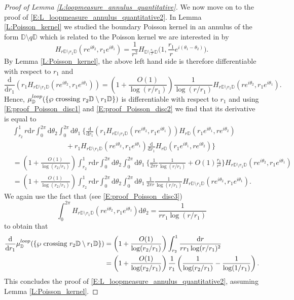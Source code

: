 \documentclass[11pt]{article}
\theoremstyle{remark}
\newcommand{\D}{\mathbb{D}}
\renewcommand{\d}{\mathrm{d}}
\def \loopmeasure{\mu^{\rm loop}}
\numberwithin{equation}{section}
\begin{document}
\begin{proof}[Proof of Lemma \ref{L:loopmeasure_annulus_quantitative}]
We now move on to the proof of \eqref{E:L_loopmeasure_annulus_quantitative2}.
In Lemma \ref{L:Poisson_kernel} we studied the boundary Poisson kernel in an annulus of the form $\D \setminus q \D$ which is related to the Poisson kernel we are interested in by
\[
H_{r \D \setminus r_1 \D}(r e^{i\theta_2},r_1 e^{i\theta_1}) = \frac{1}{r^2} H_{\D \setminus \frac{r_1}{r} \D}\Big(1, \frac{r_1}{r} e^{i(\theta_1-\theta_2)}\Big).
\]
By Lemma \ref{L:Poisson_kernel}, the above left hand side is therefore differentiable with respect to $r_1$ and
\[
\frac{\d}{\d r_1} \left( r_1 H_{r \D \setminus r_1 \D}(r e^{i\theta_2},r_1 e^{i\theta_1}) \right) = \left( 1 + \frac{O(1)}{\log(r/r_1)} \right) \frac{1}{\log(r/r_1)} H_{r \D \setminus r_1 \D}(r e^{i\theta_2},r_1 e^{i\theta_1}).
\]
Hence, $\loopmeasure_\D ( \{ \wp \mathrm{~crossing~} r_2 \D \setminus r_1 \D \} )$ is differentiable with respect to $r_1$ and using \eqref{E:proof_Poisson_disc1} and \eqref{E:proof_Poisson_disc2} we find that its derivative is equal to
\begin{align*}
& \int_{r_2}^1 r \d r \int_0^{2\pi}  \d \theta_2 \int_0^{2\pi} \d \theta_1 ~
\Big\{ \frac{\d}{\d r_1} \left( r_1 H_{r \D \setminus r_1 \D}(r e^{i\theta_2},r_1 e^{i\theta_1}) \right) H_{r \D}(r_1 e^{i\theta_1},r e^{i\theta_2}) \\
& ~~~~~~~~~~~~~~~~~~~~~~~~~~~~~~~~~~ +
r_1 H_{r \D \setminus r_1 \D}(r e^{i\theta_2},r_1 e^{i\theta_1}) \frac{\d }{\d r_1} H_{r \D}(r_1 e^{i\theta_1},r e^{i\theta_2})
\Big\} \\
& = \left( 1 + \frac{O(1)}{\log(r_2/r_1)} \right) \int_{r_2}^1 r \d r \int_0^{2\pi} \d \theta_2 \int_0^{2\pi} \d \theta_1 ~
\Big\{ \frac{1}{2\pi r} \frac{1}{\log(r/r_1)} + O(1) \frac{r_1}{r^2} \Big\} H_{r \D \setminus r_1 \D}(r e^{i\theta_2},r_1 e^{i\theta_1}) \\
& = \left( 1 + \frac{O(1)}{\log(r_2/r_1)} \right) \int_{r_2}^1 r \d r \int_0^{2\pi} \d \theta_2 \int_0^{2\pi} \d \theta_1 ~ \frac{1}{2\pi r} \frac{1}{\log(r/r_1)} H_{r \D \setminus r_1 \D}(r e^{i\theta_2},r_1 e^{i\theta_1}).
\end{align*}
We again use the fact that (see \eqref{E:proof_Poisson_disc3})
\[
\int_0^{2\pi} H_{r \D \setminus r_1 \D}(r e^{i\theta_2},r_1 e^{i\theta_1}) \d \theta_2
= \frac{1}{r r_1 \log(r/r_1)}
\]
to obtain that
\begin{align*}
\frac{\d}{\d r_1} \loopmeasure_\D ( \{ \wp \mathrm{~crossing~} r_2 \D \setminus r_1 \D \} )
& = \left( 1 + \frac{O(1)}{\log(r_2/r_1)} \right) \int_{r_2}^1 \frac{\d r}{r r_1 \log(r/r_1)^2} \\
& = \left( 1 + \frac{O(1)}{\log(r_2/r_1)} \right) \frac{1}{r_1} \left( \frac{1}{\log(r_2/r_1)} - \frac{1}{\log(1/r_1)} \right).
\end{align*}
This concludes the proof of \eqref{E:L_loopmeasure_annulus_quantitative2}, assuming Lemma \ref{L:Poisson_kernel}.
\end{proof}
\end{document}
